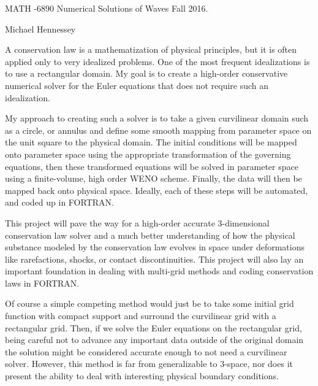 

\begin{center}
\large{MATH -6890 \hspace{1in} Numerical Solutions of Waves \hspace{1in}Fall 2016.}\end{center}
Michael Hennessey
\bigskip
{}\ec

A conservation law is a mathematization of physical principles, but it is often applied only to very idealized problems. One of the most frequent idealizations is to use a rectangular domain. My goal is to create a high-order conservative numerical solver for the Euler equations that does not require such an idealization. \par

 My approach to creating such a solver is to take a given curvilinear domain such as a circle, or annulus and define some smooth mapping from parameter space on the unit square to the physical domain. The initial conditions will be mapped onto parameter space using the appropriate transformation of the governing equations, then these transformed equations will be solved in parameter space using a finite-volume, high order WENO scheme. Finally, the data will then be mapped back onto physical space. Ideally, each of these steps will be automated, and coded up in FORTRAN.\par

 This project will pave the way for a high-order accurate 3-dimensional conservation law solver and a much better understanding of how the physical substance modeled by the conservation law evolves in space under deformations like rarefactions, shocks, or contact discontinuities. This project will also lay an important foundation in dealing with multi-grid methods and coding conservation laws in FORTRAN.\par

Of course a simple competing method would just be to take some initial grid function with compact support and surround the curvilinear grid with a rectangular grid. Then, if we solve the Euler equations on the rectangular grid, being careful not to advance any important data outside of the original domain the solution might be considered accurate enough to not need a curvilinear solver. However, this method is far from generalizable to 3-space, nor does it present the ability to deal with interesting physical boundary conditions. \par

